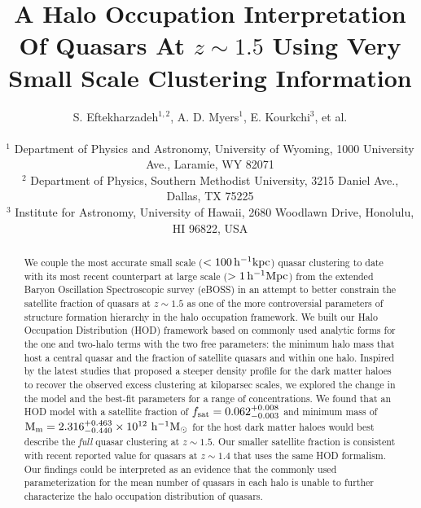 \documentclass[useAMS,usenatbib]{mn2e}
\begin{document}

\title[Quasar HOD at $z \sim 1.5$]{A Halo Occupation Interpretation Of Quasars At $z\sim1.5$ Using Very Small Scale Clustering Information}
% 
\author[Eftekharzadeh et al.]{S. Eftekharzadeh$^{1,2}$,  A. D. Myers$^{1}$, E. Kourkchi$^{3}$, et al.\\
\\
$^{1}$ Department of Physics and Astronomy, University of Wyoming, 1000 University Ave., Laramie, WY 82071\\
$^{2}$ Department of Physics, Southern Methodist University, 3215 Daniel Ave., Dallas, TX 75225\\
$^{3}$ Institute for Astronomy, University of Hawaii, 2680 Woodlawn Drive, Honolulu, HI 96822, USA}
\maketitle


\begin{abstract}
We couple the most accurate small scale ($< 100\, \rm h^{-1}kpc$) quasar clustering 
to date with its most recent counterpart at large scale ($> 1\, \rm h^{-1}Mpc$) 
from the extended Baryon Oscillation Spectroscopic survey (eBOSS) in an attempt 
to better constrain the satellite fraction of quasars at $z\sim 1.5$ as one of the more controversial 
parameters of structure formation hierarchy in the halo occupation framework. 
We built our Halo Occupation Distribution (HOD) framework based on commonly 
used analytic forms for the one and two-halo terms with the two free 
parameters: the minimum halo mass that host a central quasar and the fraction of satellite quasars and within one halo. 
Inspired by the latest studies that proposed a steeper density profile for the dark 
matter haloes to recover the observed excess clustering at kiloparsec scales, we 
explored the change in the model and the best-fit parameters for a range of 
concentrations. We found that an HOD model with a satellite fraction of $f_{\rm 
sat} = 0.062_{-0.003}^{+0.008}$ and minimum mass of $\rm M_{m} = 
2.316_{-0.440}^{+0.463} \times 10^{12}\, \, \rm h^{-1} M_{\odot}$ for the host dark matter 
haloes would best describe the {\it full} quasar clustering at $z \sim 1.5$. Our 
smaller satellite fraction is consistent with recent reported value for 
quasars at $z\sim 1.4$ that uses the same HOD formalism. Our findings could be interpreted as an evidence that the commonly used parameterization for the mean number of quasars in each 
halo is unable to further characterize the halo occupation distribution of 
quasars.   



\end{abstract}
\end{document}
